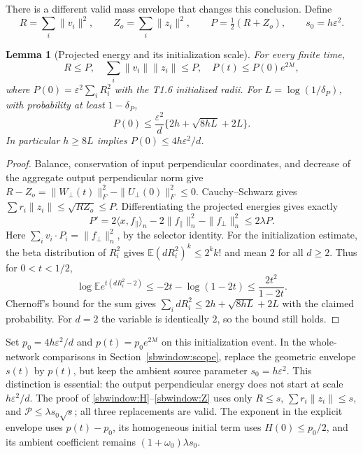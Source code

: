 \documentclass{article} %
\theoremstyle{plain}
\newtheorem{lemma}[theorem]{Lemma}
\theoremstyle{definition}
\theoremstyle{remark}
\begin{document}
There is a different valid mass envelope that changes this conclusion.
Define
\[
 R=\sum_i\|v_i\|^2,\qquad Z_o=\sum_i\|z_i\|^2,\qquad
 P=\tfrac12(R+Z_o),\qquad s_0=h\varepsilon^2.
\]
\begin{lemma}[Projected energy and its initialization scale]
\label{sbguard:projected-mass}
For every finite time,
\[
 R\le P,\quad \sum_i\|v_i\|\|z_i\|\le P,\quad
 P(t)\le P(0)e^{2\lambda t},
\]
where $P(0)=\varepsilon^2\sum_i R_i^2$ with the T1.6 initialized radii.
For $L=\log(1/\delta_P)$, with probability at least $1-\delta_P$,
\begin{equation}\label{sbguard:projected-init}
 P(0)\le\frac{\varepsilon^2}{d}
                 \{2h+\sqrt{8hL}+2L\}.
\end{equation}
In particular $h\ge8L$ implies $P(0)\le4h\varepsilon^2/d$.
\end{lemma}
\begin{proof}
Balance, conservation of input perpendicular coordinates, and decrease
of the aggregate output perpendicular norm give
$R-Z_o=\|W_\perp(t)\|_F^2-\|U_\perp(0)\|_F^2\le0$.
Cauchy--Schwarz gives $\sum r_i\|z_i\|\le\sqrt{RZ_o}\le P$.
Differentiating the projected energies gives exactly
\[
 P'=2\langle x,f_\parallel\rangle_n-2\|f_\parallel\|_n^2
                              -\|f_\perp\|_n^2\le2\lambda P.
\]
Here $\sum_i v_i\cdot P_i=\|f_\perp\|_n^2$, by the selector identity.
For the initialization estimate, the beta distribution of $R_i^2$
gives $\mathbb E(dR_i^2)^k\le2^k k!$ and mean $2$ for all $d\ge2$.
Thus for $0<t<1/2$,
\[
 \log\mathbb E e^{t(dR_i^2-2)}
 \le-2t-\log(1-2t)\le\frac{2t^2}{1-2t}.
\]
Chernoff's bound for the sum gives
$\sum_i dR_i^2\le2h+\sqrt{8hL}+2L$ with the claimed probability.
For $d=2$ the variable is identically $2$, so the bound still holds.
\end{proof}

Set $p_0=4h\varepsilon^2/d$ and $p(t)=p_0e^{2\lambda t}$ on this
initialization event. In the whole-network comparisons in
Section~\ref{sbwindow:scope}, replace the geometric envelope $s(t)$
by $p(t)$, but keep the ambient source parameter $s_0=h\varepsilon^2$.
This distinction is essential: the output perpendicular energy does not
start at scale $h\varepsilon^2/d$. The proof of
\eqref{sbwindow:H}--\eqref{sbwindow:Z} uses only $R\le s$,
$\sum r_i\|z_i\|\le s$, and
$\mathcal P\le\lambda s_0\sqrt{s}$; all three replacements are valid.
The exponent in the explicit envelope uses $p(t)-p_0$, its homogeneous
initial term uses $H(0)\le p_0/2$, and its ambient coefficient remains
$(1+\omega_0)\lambda s_0$.
\end{document}
